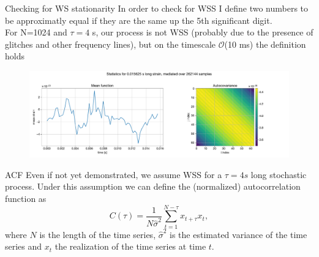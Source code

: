 \documentclass[
10pt,
aspectratio=169,
]{beamer}
\begin{document}
\begin{frame}{Checking for WS stationarity}
In order to check for WSS I define two numbers to be approximatly equal if they are the same up the 5th significant digit.\\
For N=1024 and $\tau=4$ s, our process is not WSS (probably due to the presence of glitches and other frequency lines), but on the timescale $\mathcal{O}$(10 ms) the definition holds
\begin{figure}
    \centering
    \includegraphics[width=\linewidth]{statWSS.pdf}
\end{figure}
    
\end{frame}
\begin{frame}{ACF}
    Even if not yet demonstrated, we assume WSS for a $\tau = 4 s$ long stochastic process. Under this assumption we can define the (normalized) autocorrelation function as
    \begin{equation}
        C(\tau) = \frac{1}{N \hat{\sigma}^2}\sum_{t=1}^{N-\tau}x_{t+\tau}x_t,
    \end{equation}
    where $N$ is the length of the time series, $\hat{\sigma}^2$ is the estimated variance of the time series and $x_t$ the realization of the time series at time $t$.
    
\end{frame}
\end{document}
